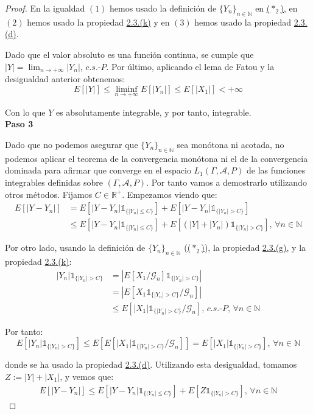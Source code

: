 \begin{proof}
En la igualdad $(1)$ hemos usado la definición de $\{Y_n\}_{n\in\mathds{N}}$ en \hyperref[aux2]{($*_2$)}, en $(2)$ hemos usado la propiedad \hyperref[PropE5]{2.3.(k)} y en $(3)$ hemos usado la propiedad \hyperref[PropE6]{2.3.(d)}.

Dado que el valor absoluto es una función continua, se cumple que $|Y| = \lim_{n\to +\infty} |Y_n|$, $c.s.\text{-}P$. Por último, aplicando el lema de Fatou y la desigualdad anterior obtenemos:
$$E[|Y|]\leq \liminf_{n\to +\infty}E[|Y_n|]\leq E[|X_1|]< +\infty $$

Con lo que $Y$ es absolutamente integrable, y por tanto, integrable.\\

\textbf{Paso 3}

Dado que no podemos asegurar que $\{Y_n\}_{n\in\mathds{N}}$ sea monótona ni acotada, no podemos aplicar el teorema de la convergencia monótona ni el de la convergencia dominada para afirmar que converge en el espacio $L_1(\Gamma,\mathcal{A} ,P)$ de las funciones integrables definidas sobre $(\Gamma,\mathcal{A} ,P)$. Por tanto vamos a demostrarlo utilizando otros métodos. Fijamos $C\in \mathds{R}^+$. Empezamos viendo que:
\begin{align*}
E[|Y-Y_n|] &=  E[|Y-Y_n|\mathds{1}_{\{|Y_n|\leq C\}}] + E[|Y-Y_n|\mathds{1}_{\{|Y_n|> C\}}]\\
&\leq E[|Y-Y_n|\mathds{1}_{\{|Y_n|\leq C\}}] + E[(|Y|+|Y_n|)\mathds{1}_{\{|Y_n|> C\}}]\text{, }\forall n\in\mathds{N}
\end{align*}

Por otro lado, usando la definición de $\{Y_n\}_{n\in\mathds{N}}$ (\hyperref[aux2]{($*_2$)}), la propiedad \hyperref[PropS2]{2.3.(g)}, y la propiedad \hyperref[PropE3]{2.3.(k)}:
\begin{align*}
|Y_n| \mathds{1}_{\{|Y_n|> C\}} &= |E[X_1/\mathscr{G}_n]\mathds{1}_{\{|Y_n|> C\}}| \\
&= |E[X_1 \mathds{1}_{\{|Y_n|> C\}}/\mathscr{G}_n]|\\
&\leq E[|X_1| \mathds{1}_{\{|Y_n|> C\}}/\mathscr{G}_n]\text{, } c.s.\text{-}P \text{, }\forall n\in\mathds{N}
\end{align*}

Por tanto:
$$E[|Y_n| \mathds{1}_{\{|Y_n|> C\}}]\leq E[E[|X_1| \mathds{1}_{\{|Y_n|> C\}}/\mathscr{G}_n]] = E[|X_1| \mathds{1}_{\{|Y_n|> C\}}] \text{, }\forall n\in\mathds{N}$$

donde se ha usado la propiedad \hyperref[PropE6]{2.3.(d)}. Utilizando esta desigualdad, tomamos $Z :=|Y|+|X_1|$, y  vemos que:
\begin{gather}\tag{$*_3$}\label{aux3}
E[|Y-Y_n|]\leq E[|Y-Y_n|\mathds{1}_{\{|Y_n|\leq C\}}] + E[Z\mathds{1}_{\{|Y_n|> C\}}] \text{, }\forall n\in\mathds{N}
\end{gather}


\end{proof}
